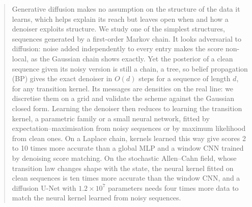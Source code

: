 \documentclass{article}
\begin{document}

\printAffiliationsAndNotice{}

\begin{abstract}
Generative diffusion makes no assumption on the structure of the data it learns, which helps explain its reach but
leaves open when and how a denoiser exploits structure. We study one of the simplest structures, sequences generated by
a first-order Markov chain. It looks adversarial to diffusion: noise added independently to every entry makes the score
non-local, as the Gaussian chain shows exactly. Yet the posterior of a clean sequence given its noisy version is still a
chain, a tree, so belief propagation (BP) gives the exact denoiser in $O(d)$ steps for a sequence of length $d$, for any
transition kernel. Its messages are densities on the real line: we discretise them on a grid and validate the scheme
against the Gaussian closed form. Learning the denoiser then reduces to learning the transition kernel, a parametric
family or a small neural network, fitted by expectation--maximisation from noisy sequences or by maximum likelihood from
clean ones. On a Laplace chain, kernels learned this way give scores 2 to 10 times more accurate than a global MLP and a
window CNN trained by denoising score matching. On the stochastic Allen--Cahn field, whose transition law changes shape
with the state, the neural kernel fitted on clean sequences is ten times more accurate than the window CNN, and a
diffusion U-Net with $1.2\times10^7$ parameters needs four times more data to match the neural kernel learned from noisy
sequences.
\end{abstract}
\end{document}
